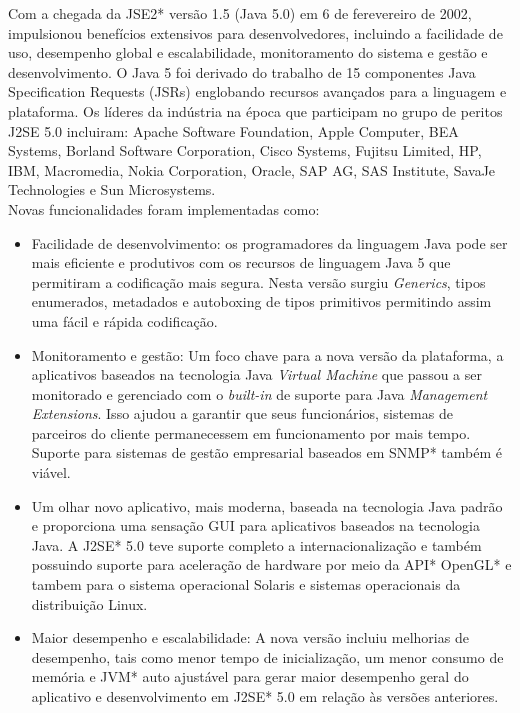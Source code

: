 	Com a chegada da JSE2* versão 1.5 (Java 5.0) em 6 de ferevereiro de 2002, impulsionou benefícios extensivos para desenvolvedores, incluindo a facilidade de uso, desempenho global e escalabilidade, monitoramento do sistema e gestão e desenvolvimento. O Java 5 foi derivado do trabalho de 15 componentes Java Specification Requests (JSRs) englobando recursos avançados para a linguagem e plataforma. Os líderes da indústria na época que participam no grupo de peritos J2SE 5.0 incluiram: Apache Software Foundation, Apple Computer, BEA Systems, Borland Software Corporation, Cisco Systems, Fujitsu Limited, HP, IBM, Macromedia, Nokia Corporation, Oracle, SAP AG, SAS Institute, SavaJe Technologies e Sun Microsystems.\\
	
	Novas funcionalidades foram implementadas como:
	\begin{itemize}
	  \item Facilidade de desenvolvimento: os programadores da linguagem Java pode ser mais eficiente e produtivos com os recursos de linguagem Java 5 que permitiram a codificação mais segura. Nesta versão surgiu {\it Generics}, tipos enumerados, metadados e autoboxing de tipos primitivos permitindo assim uma fácil e rápida codificação.
	  \item Monitoramento e gestão: Um foco chave para a nova versão da plataforma, a aplicativos baseados na tecnologia Java {\it Virtual Machine} que passou a ser monitorado e gerenciado com o {\it built-in} de suporte para Java {\it Management Extensions}. Isso ajudou a garantir que seus funcionários, sistemas de parceiros do cliente permanecessem em funcionamento por mais tempo. Suporte para sistemas de gestão empresarial baseados em SNMP* também é viável.
	  \item Um olhar novo aplicativo, mais moderna, baseada na tecnologia Java padrão e proporciona uma sensação GUI para aplicativos baseados na tecnologia Java. A J2SE* 5.0 teve suporte completo a internacionalização e também possuindo suporte para aceleração de hardware por meio da API* OpenGL* e tambem para o sistema operacional Solaris e sistemas operacionais da distribuição Linux.
	  \item Maior desempenho e escalabilidade: A nova versão incluiu melhorias de desempenho, tais como menor tempo de inicialização, um menor consumo de memória e JVM* auto ajustável para gerar maior desempenho geral do aplicativo e desenvolvimento em J2SE* 5.0 em relação às versões anteriores.\\
	\end{itemize}

